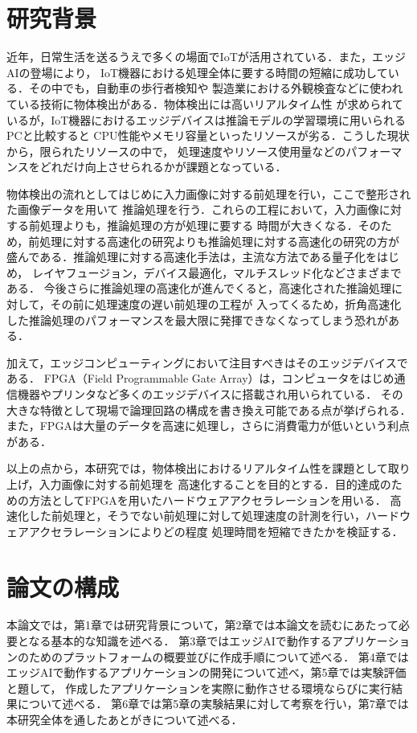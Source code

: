 \documentclass[11pt,a4j]{jreport}
\begin{document}
\section{研究背景}

近年，日常生活を送るうえで多くの場面でIoTが活用されている．また，エッジAIの登場により，
IoT機器における処理全体に要する時間の短縮に成功している．その中でも，自動車の歩行者検知や
製造業における外観検査などに使われている技術に物体検出がある．物体検出には高いリアルタイム性
が求められているが，IoT機器におけるエッジデバイスは推論モデルの学習環境に用いられるPCと比較すると
CPU性能やメモリ容量といったリソースが劣る．こうした現状から，限られたリソースの中で，
処理速度やリソース使用量などのパフォーマンスをどれだけ向上させられるかが課題となっている．

物体検出の流れとしてはじめに入力画像に対する前処理を行い，ここで整形された画像データを用いて
推論処理を行う．これらの工程において，入力画像に対する前処理よりも，推論処理の方が処理に要する
時間が大きくなる．そのため，前処理に対する高速化の研究よりも推論処理に対する高速化の研究の方が
盛んである．推論処理に対する高速化手法\cite{AccelTemp}は，主流な方法である量子化をはじめ，
レイヤフュージョン，デバイス最適化，マルチスレッド化などさまざまである．
今後さらに推論処理の高速化が進んでくると，高速化された推論処理に対して，その前に処理速度の遅い前処理の工程が
入ってくるため，折角高速化した推論処理のパフォーマンスを最大限に発揮できなくなってしまう恐れがある．

加えて，エッジコンピューティングにおいて注目すべきはそのエッジデバイスである．
FPGA（Field Programmable Gate Array）は，コンピュータをはじめ通信機器やプリンタなど多くのエッジデバイスに搭載され用いられている．
その大きな特徴として現場で論理回路の構成を書き換え可能である点が挙げられる．
また，FPGAは大量のデータを高速に処理し，さらに消費電力が低いという利点がある．

以上の点から，本研究では，物体検出におけるリアルタイム性を課題として取り上げ，入力画像に対する前処理を
高速化することを目的とする．目的達成のための方法としてFPGAを用いたハードウェアアクセラレーションを用いる．
高速化した前処理と，そうでない前処理に対して処理速度の計測を行い，ハードウェアアクセラレーションによりどの程度
処理時間を短縮できたかを検証する．

\section{論文の構成}
本論文では，第1章では研究背景について，第2章では本論文を読むにあたって必要となる基本的な知識を述べる．
第3章ではエッジAIで動作するアプリケーションのためのプラットフォームの概要並びに作成手順について述べる．
第4章ではエッジAIで動作するアプリケーションの開発について述べ，第5章では実験評価と題して，
作成したアプリケーションを実際に動作させる環境ならびに実行結果について述べる．
第6章では第5章の実験結果に対して考察を行い，第7章では本研究全体を通したあとがきについて述べる．
\end{document}
